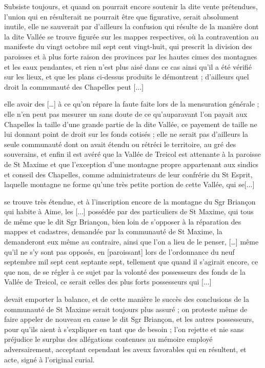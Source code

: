 \documentclass[a4paper,twoside,openany]{article}
\begin{document}
Subsiste toujours, et quand on pourrait encore soutenir la dite vente prétendues, l'union qui en résulterait ne pourrait être que figurative, serait absolument inutile, elle ne sauverait par d'ailleurs la confusion qui résulte de la manière dont la dite Vallée se trouve figurée sur les mappes respectives, où la contravention au manifeste du vingt octobre mil sept cent vingt-huit, qui prescrit la division des paroisses et à plus forte raison des provinces par les hautes cimes des montagnes et les eaux pendantes, et rien n'est plus aisé dans ce cas ainsi qu'il a été vérifié sur les lieux, et que les plans ci-dessus produits le démontrent ; d'ailleurs quel droit la communauté des Chapelles peut [...]


elle avoir des […] à ce qu’on répare la faute faite lors de la mensuration générale ; elle n'en peut pas mesurer un sans doute de ce qu’auparavant l’on payait aux Chapelles  la taille d'une grande partie de la dite Vallée, ce payement de taille ne lui donnant point de droit sur les fonds cotisés ; elle ne serait pas d'ailleurs la seule communauté dont on avait étendu ou rétréci le territoire, au gré des souverains, et enfin il est avéré que la Vallée de Treicol est attenante à la paroisse de St Maxime et que l’exception d'une montagne propre appartenant aux sindics et conseil des Chapelles, comme administrateurs de leur confrérie du St Esprit, laquelle montagne ne forme qu'une très petite portion de cette Vallée, qui se[...]

se trouve très étendue, et à l'inscription encore de la montagne du Sgr Brian\c{c}on qui habite à Aime, les [...] possédée par des particuliers de St Maxime, qui tous de même que le dit Sgr Brian\c{c}on, bien loin de s'opposer à la réparation des mappes et cadastres, demandée par la communauté de St Maxime, la demanderont eux même au contraire, ainsi que l'on a lieu de le penser, […] même qu'il ne s'y sont pas opposés, en [paroissant] lors de l'ordonnance du neuf septembre mil sept cent septante sept, tellement que quand il s'agirait encore, ce que non, de se régler à ce sujet par la volonté des possesseurs des fonds de la Vallée de Treicol, ce serait celles des plus forts possesseurs qui [...]


devait emporter la balance, et de cette manière le succès des conclusions de la communauté de St Maxime serait toujours plus assuré ; on proteste même de faire appeler de nouveau en cause le dit Sgr Brian\c{c}on, et les autres possesseurs, pour qu'ils aient à s'expliquer en tant que de besoin ; l'on rejette et nie sans préjudice le surplus des allégations contenues au mémoire employé adversairement, acceptant cependant les aveux favorables qui en résultent, et acte, signé à l'original curial.
\end{document}
